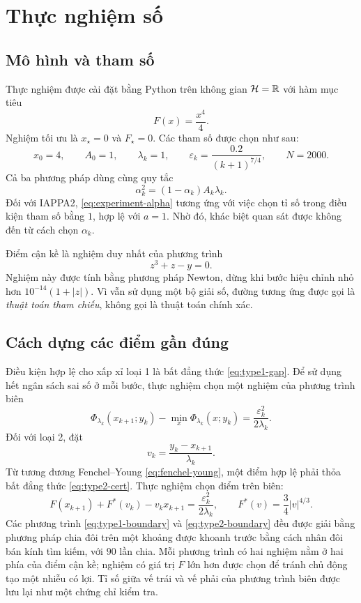 \section{Thực nghiệm số}

\subsection{Mô hình và tham số}

Thực nghiệm được cài đặt bằng Python trên không gian $\mathcal{H}=\mathbb{R}$ với hàm mục tiêu
\[
F(x)=\frac{x^4}{4}.
\]
Nghiệm tối ưu là $x_{\star}=0$ và $F_{\star}=0$. Các tham số được chọn như sau:
\begin{equation}
x_0=4,
\qquad
A_0=1,
\qquad
\lambda_k=1,
\qquad
\varepsilon_k=\frac{0.2}{(k+1)^{7/4}},
\qquad
N=2000.
\label{eq:experiment-params}
\end{equation}
Cả ba phương pháp dùng cùng quy tắc
\begin{equation}
\alpha_k^2=(1-\alpha_k)A_k\lambda_k.
\label{eq:experiment-alpha}
\end{equation}
Đối với IAPPA2, \eqref{eq:experiment-alpha} tương ứng với việc chọn tỉ số trong điều kiện tham số bằng $1$, hợp lệ với $a=1$. Nhờ đó, khác biệt quan sát được không đến từ cách chọn $\alpha_k$.

Điểm cận kề là nghiệm duy nhất của phương trình
\[
z^3+z-y=0.
\]
Nghiệm này được tính bằng phương pháp Newton, dừng khi bước hiệu chỉnh nhỏ hơn $10^{-14}(1+|z|)$. Vì vẫn sử dụng một bộ giải số, đường tương ứng được gọi là \emph{thuật toán tham chiếu}, không gọi là thuật toán chính xác.

\subsection{Cách dựng các điểm gần đúng}

Điều kiện hợp lệ cho xấp xỉ loại 1 là bất đẳng thức \eqref{eq:type1-gap}. Để sử dụng hết ngân sách sai số ở mỗi bước, thực nghiệm chọn một nghiệm của phương trình biên
\begin{equation}
\Phi_{\lambda_k}(x_{k+1};y_k)
-\min_x\Phi_{\lambda_k}(x;y_k)
=\frac{\varepsilon_k^2}{2\lambda_k}.
\label{eq:type1-boundary}
\end{equation}
Đối với loại 2, đặt
\[
v_k=\frac{y_k-x_{k+1}}{\lambda_k}.
\]
Từ tương đương Fenchel--Young \eqref{eq:fenchel-young}, một điểm hợp lệ phải thỏa bất đẳng thức \eqref{eq:type2-cert}. Thực nghiệm chọn điểm trên biên:
\begin{equation}
F(x_{k+1})+F^{*}(v_k)-v_kx_{k+1}
=\frac{\varepsilon_k^2}{2\lambda_k},
\qquad
F^{*}(v)=\frac{3}{4}|v|^{4/3}.
\label{eq:type2-boundary}
\end{equation}
Các phương trình \eqref{eq:type1-boundary} và \eqref{eq:type2-boundary} đều được giải bằng phương pháp chia đôi trên một khoảng được khoanh trước bằng cách nhân đôi bán kính tìm kiếm, với $90$ lần chia. Mỗi phương trình có hai nghiệm nằm ở hai phía của điểm cận kề; nghiệm có giá trị $F$ lớn hơn được chọn để tránh chủ động tạo một nhiễu có lợi. Tỉ số giữa vế trái và vế phải của phương trình biên được lưu lại như một chứng chỉ kiểm tra.


